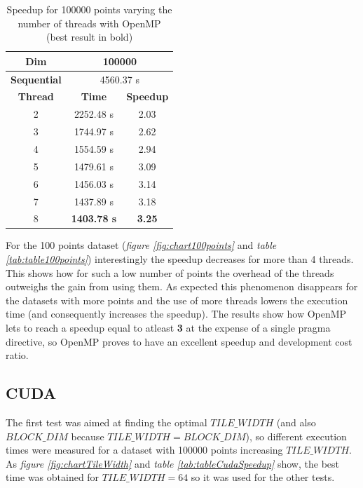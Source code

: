 \documentclass[10pt,twocolumn,letterpaper]{article}
\begin{document}
\begin{table}[]
\centering
\begin{tabular}{|c|c|c|}
\hline
\textbf{Dim} & \multicolumn{2}{c|}{100000} \\ \hline
\textbf{Sequential} & \multicolumn{2}{c|}{4560.37 s} \\ \hline
\textbf{Thread} & \textbf{Time} & \textbf{Speedup} \\ \hline
2 & 2252.48 s & 2.03 \\ \hline
3 & 1744.97 s & 2.62 \\ \hline
4 & 1554.59 s & 2.94 \\ \hline
5 & 1479.61 s & 3.09 \\ \hline
6 & 1456.03 s & 3.14 \\ \hline
7 & 1437.89 s & 3.18 \\ \hline
8 & \textbf{1403.78 s} & \textbf{3.25} \\ \hline
\end{tabular}
\caption{Speedup for 100000 points varying the number of threads with OpenMP (best result in bold)}
\label{tab:table100000points}
\end{table}

For the 100 points dataset (\emph{figure \ref{fig:chart100points}} and \emph{table \ref{tab:table100points}}) interestingly the speedup decreases for more than 4 threads. This shows how for such a low number of points the overhead of the threads outweighs the gain from using them. As expected this phenomenon disappears for the datasets with more points and the use of more threads lowers the execution time (and consequently increases the speedup). 
The results show how OpenMP lets to reach a speedup equal to atleast \textbf{3} at the expense of a single pragma directive, so OpenMP proves to have an excellent speedup and development cost ratio.


\subsection{CUDA}

The first test was aimed at finding the optimal $TILE\_WIDTH$ (and also $BLOCK\_DIM$ because $TILE\_WIDTH = BLOCK\_DIM$), so different execution times were measured for a dataset with 100000 points increasing $TILE\_WIDTH$. As \emph{figure \ref{fig:chartTileWidth}} and \emph{table \ref{tab:tableCudaSpeedup}} show, the best time was obtained for $TILE\_WIDTH = 64$ so it was used for the other tests.
\end{document}

